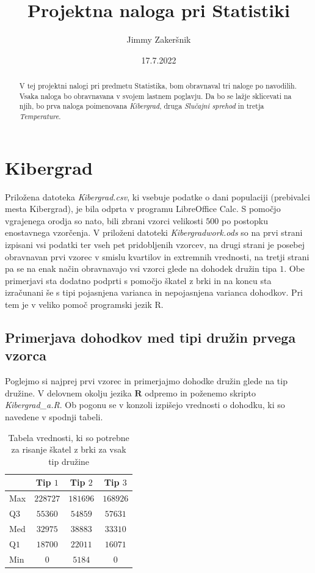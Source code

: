 \documentclass[a4paper, 10pt]{article}
\title{Projektna naloga pri Statistiki}
\date{17.7.2022}
\author{Jimmy Zakeršnik}
\newcommand{\pojem}[1]{\emph{#1}}
\begin{document}
	\maketitle
	\thispagestyle{empty}
	\newpage
	\begin{abstract}
		V tej projektni nalogi pri predmetu Statistika, bom obravnaval tri naloge po navodilih. Vsaka naloga bo obravnavana v svojem lastnem poglavju. Da bo se lažje sklicevati na njih, bo prva naloga poimenovana \pojem{Kibergrad}, druga \pojem{Slučajni sprehod} in tretja \pojem{Temperature}.
	\end{abstract}
	\newpage
	\section{Kibergrad}
	Priložena datoteka \textit{Kibergrad.csv}, ki vsebuje podatke o dani populaciji (prebivalci mesta Kibergrad), je bila odprta v programu LibreOffice Calc. S pomočjo vgrajenega orodja so nato, bili zbrani vzorci velikosti $500$ po postopku enostavnega vzorčenja. V priloženi datoteki \textit{Kibergradwork.ods} so na prvi strani izpisani vsi podatki ter vseh pet pridobljenih vzorcev, na drugi strani je posebej obravnavan prvi vzorec v smislu kvartilov in extremnih vrednosti, na tretji strani pa se na enak način obravnavajo vsi vzorci glede na dohodek družin tipa $1$. Obe primerjavi sta dodatno podprti s pomočjo škatel z brki in na koncu sta izračunani še s tipi pojasnjena varianca in nepojasnjena varianca dohodkov. Pri tem je v veliko pomoč programski jezik R.
	
	\subsection{Primerjava dohodkov med tipi družin prvega vzorca}
	Poglejmo si najprej prvi vzorec in primerjajmo dohodke družin glede na tip družine. V delovnem okolju jezika $\textbf{R}$ odpremo in poženemo skripto \textit{Kibergrad\_a.R}. Ob pogonu se v konzoli izpišejo vrednosti o dohodku, ki so navedene v spodnji tabeli.
	\begin{table}[h!]
		\centering
		\begin{tabular}{|l|c|c|c|}
			\hline
			& Tip $1$ & Tip $2$ & Tip $3$ \\ \hline
			Max & $228727$ & $181696$ & $168926$ \\ \hline
			Q$3$ & $55360$ & $54859$ & $57631$ \\ \hline
			Med & $32975$ & $38883$ & $33310$ \\ \hline
			Q$1$ & $18700$ & $22011$ & $16071$ \\ \hline
			Min & $0$ & $5184$ & $0$ \\ \hline
		\end{tabular}
	\caption{Tabela vrednosti, ki so potrebne za risanje škatel z brki za vsak tip družine}
	\end{table}
\end{document}
